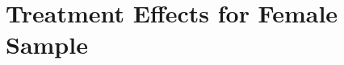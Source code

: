 \section{Treatment Effects for Female Sample}


\begin{center}
	
\end{center}

\begin{center}
	
\end{center}

\begin{center}
	
\end{center}

\begin{center}
	
\end{center}

\begin{center}
	
\end{center}

\begin{center}
	
\end{center}

\begin{center}
	
\end{center}

\begin{center}
	
\end{center}

\begin{center}
	
\end{center}

\begin{center}
	
\end{center}

\begin{center}
	
\end{center}

\begin{center}
	
\end{center}

\begin{center}
	
\end{center}

\begin{center}
	
\end{center}


